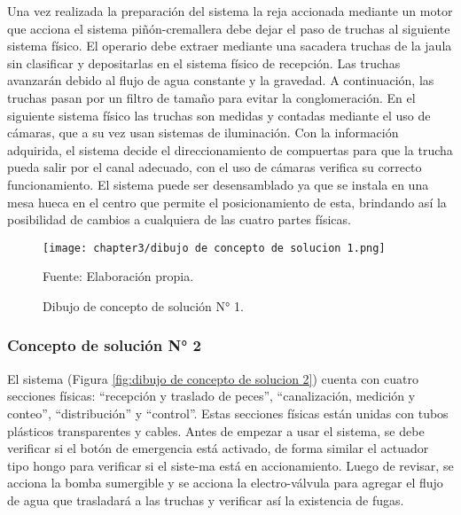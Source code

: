 Una vez realizada la preparación del sistema la reja accionada mediante un motor que acciona el sistema piñón-cremallera debe dejar el paso de truchas al siguiente sistema físico. El operario debe extraer mediante una sacadera truchas de la jaula sin clasificar y depositarlas en el sistema físico de recepción. Las truchas avanzarán debido al flujo de agua constante y la gravedad. A continuación, las truchas pasan por un filtro de tamaño para evitar la conglomeración. En el siguiente sistema físico las truchas son medidas y contadas mediante el uso de cámaras, que a su vez usan sistemas de iluminación. Con la información adquirida, el sistema decide el direccionamiento de compuertas para que la trucha pueda salir por el canal adecuado, con el uso de cámaras verifica su correcto funcionamiento.
El sistema puede ser desensamblado ya que se instala en una mesa hueca en el centro que permite el posicionamiento de esta, brindando así la posibilidad de cambios a cualquiera de las cuatro partes físicas.


\begin{figure}[H]
	\centering
	\texttt{[image: chapter3/dibujo de concepto de solucion 1.png]}
	\caption{Dibujo de concepto de solución N° 1.}
	Fuente: Elaboración propia.
	\label{fig:dibujo de concepto de solucion 1}
\end{figure}


\subsubsection{Concepto de solución N° 2}

El sistema (Figura \ref{fig:dibujo de concepto de solucion 2}) cuenta con cuatro secciones físicas: “recepción y traslado de peces”, “canalización, medición y conteo”, “distribución” y “control”. Estas secciones físicas están unidas con tubos plásticos transparentes y cables. Antes de empezar a usar el sistema, se debe verificar si el botón de emergencia está activado, de forma similar el actuador tipo hongo para verificar si el siste-ma está en accionamiento. Luego de revisar, se acciona la bomba sumergible y se acciona la electro-válvula para agregar el flujo de agua que trasladará a las truchas y verificar así la existencia de fugas.

